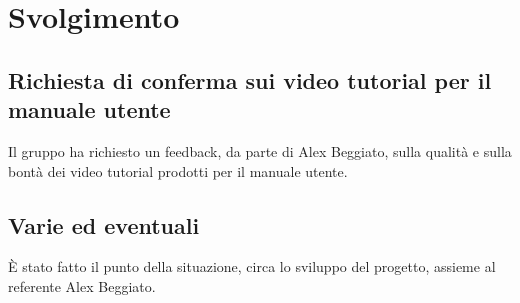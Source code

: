 \newpage
\section*{Svolgimento}

	\subsection*{Richiesta di conferma sui video tutorial per il manuale utente}
		Il gruppo ha richiesto un feedback, da parte di Alex Beggiato, sulla qualità e sulla bontà dei video tutorial prodotti per il manuale utente.

	\subsection*{Varie ed eventuali}
		È stato fatto il punto della situazione, circa lo sviluppo del progetto, assieme al referente Alex Beggiato.
